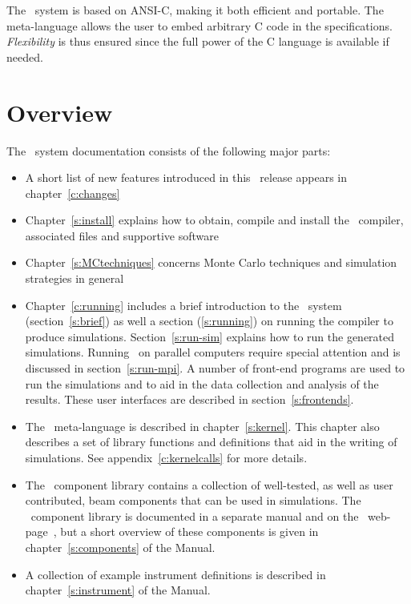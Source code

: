 The \MCS\ system is based on ANSI-C, making it both efficient and
portable. The meta-language allows the user to embed arbitrary C code in
the specifications. \textit{Flexibility} is thus ensured since the full
power of the C language is available if needed.


\section{Overview}

The \MCS\ system documentation consists of the following major
parts:
\begin{itemize}
\item A short list of new features introduced in this \MCS\ release
  appears in chapter~\ref{c:changes}
\item Chapter~\ref{s:install} explains how to obtain, compile
  and install the \MCS\ compiler, associated files and supportive software
\item Chapter~\ref{s:MCtechniques} concerns Monte Carlo techniques
  and simulation strategies in general
\item Chapter~\ref{c:running} includes a brief introduction to the
  \MCS\ system 
  (section~\ref{s:brief}) as well a section (\ref{s:running}) on running the compiler to produce
  simulations. Section~\ref{s:run-sim} explains how to run the generated
  simulations. Running \MCS\ on parallel computers require special
  attention and is discussed in section~\ref{s:run-mpi}. A number of front-end programs are used to run the
  simulations and to aid in the data collection and analysis of the
  results. These user interfaces are described in section~\ref{s:frontends}.
\item The \MCS\ meta-language is described in chapter~\ref{s:kernel}. This
  chapter also describes a set of library functions and definitions
  that aid in the writing of simulations. See
  appendix~\ref{c:kernelcalls} for more details.
\item The \MCS\ component library contains a collection of
  well-tested, as well as user contributed, beam components that can be used in simulations.
  The \MCS\ component library is documented in a separate manual
  and on the \MCS\ web-page~\cite{mcstas_webpage}, but a short overview of these
  components is given in chapter~\ref{s:components} of the Manual.
\item A collection of example instrument definitions is described in
  chapter~\ref{s:instrument} of the Manual.%

\end{itemize}

